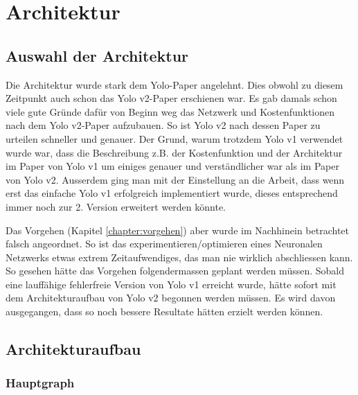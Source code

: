 \newpage
\section{Architektur}
\subsection{Auswahl der Architektur}
Die Architektur wurde stark dem Yolo-Paper \cite{yolo} angelehnt. 
Dies obwohl zu diesem Zeitpunkt auch schon das Yolo v2-Paper \cite{yolo2} erschienen war.
Es gab damals schon viele gute Gründe dafür von Beginn weg das Netzwerk und Kostenfunktionen nach dem Yolo v2-Paper aufzubauen.
So ist Yolo v2 nach dessen Paper zu urteilen schneller und genauer. 
Der Grund, warum trotzdem Yolo v1 verwendet wurde war, dass die Beschreibung z.B. der Kostenfunktion und der Architektur im Paper von Yolo v1 um einiges genauer und verständlicher war als im Paper von Yolo v2.
Ausserdem ging man mit der Einstellung an die Arbeit, dass wenn erst das \grqq{}einfache\grqq{} Yolo v1  erfolgreich implementiert wurde, dieses entsprechend immer noch zur 2. Version erweitert werden könnte.

Das Vorgehen (Kapitel \ref{chapter:vorgehen}) aber wurde im Nachhinein betrachtet falsch angeordnet. 
So ist das experimentieren/optimieren eines Neuronalen Netzwerks etwas extrem Zeitaufwendiges, das man nie wirklich abschliessen kann.
So gesehen hätte das Vorgehen folgendermassen geplant werden müssen.
Sobald eine lauffähige fehlerfreie Version von Yolo v1 erreicht wurde, hätte sofort mit dem Architekturaufbau von Yolo v2 begonnen werden müssen.
Es wird davon ausgegangen, dass so noch bessere Resultate hätten erzielt werden können.

\subsection{Architekturaufbau}
\label{chapter:Architekturaubau}
\subsubsection{Hauptgraph}

